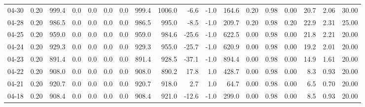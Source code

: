 \begin{threeparttable}
{\begin{tabular}{lrrrrrrrrrrrrrrrrr}
  04-30 &     0.20 &  999.4 &               0.0 &               0.0 &                0.0 &                0.0 &  999.4 & 1006.0 &       -6.6 &                     -1.0 &               164.6 &       0.20 &      0.98 &           0.00 &             20.7 &            2.06 &                  30.00 \\
  04-28 &     0.20 &  986.5 &               0.0 &               0.0 &                0.0 &                0.0 &  986.5 &  995.0 &       -8.5 &                     -1.0 &               209.7 &       0.20 &      0.98 &           0.20 &             22.9 &            2.31 &                  25.00 \\
  04-25 &     0.20 &  959.0 &               0.0 &               0.0 &                0.0 &                0.0 &  959.0 &  984.6 &      -25.6 &                     -1.0 &               622.5 &       0.00 &      0.98 &           0.00 &             21.8 &            2.21 &                  20.00 \\
  04-24 &     0.20 &  929.3 &               0.0 &               0.0 &                0.0 &                0.0 &  929.3 &  955.0 &      -25.7 &                     -1.0 &               620.9 &       0.00 &      0.98 &           0.00 &             19.2 &            2.01 &                  20.00 \\
  04-23 &     0.20 &  891.4 &               0.0 &               0.0 &                0.0 &                0.0 &  891.4 &  928.5 &      -37.1 &                     -1.0 &               894.4 &       0.00 &      0.98 &           0.00 &             14.9 &            1.61 &                  20.00 \\
  04-22 &     0.20 &  908.0 &               0.0 &               0.0 &                0.0 &                0.0 &  908.0 &  890.2 &       17.8 &                      1.0 &               428.7 &       0.00 &      0.98 &           0.00 &              8.3 &            0.93 &                  20.00 \\
  04-21 &     0.20 &  920.7 &               0.0 &               0.0 &                0.0 &                0.0 &  920.7 &  918.0 &        2.7 &                      1.0 &                64.7 &       0.00 &      0.98 &           0.00 &              6.5 &            0.70 &                  20.00 \\
  04-18 &     0.20 &  908.4 &               0.0 &               0.0 &                0.0 &                0.0 &  908.4 &  921.0 &      -12.6 &                     -1.0 &               299.0 &       0.00 &      0.98 &           0.00 &              8.5 &            0.93 &                  20.00 \\

\end{tabular}}
\end{threeparttable}
